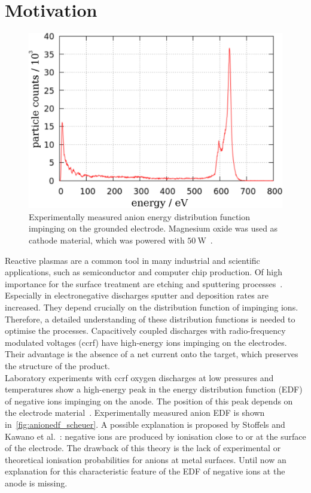 %
	\chapter*{Motivation}
%
        \begin{figure}[!b]
            \centering
            \includegraphics[width=.8\textwidth]{figures/scheuer_anionedf.pdf}
            \caption[Experimentally measured anion EDF at the anode]{%
                Experimentally measured anion energy distribution function impinging %
                on the grounded electrode. Magnesium oxide was used as cathode material, %
                which was powered with $\SI{50}{\watt}$~\cite{Scheuer15}.}
            \label{fig:anionedf_scheuer}
        \end{figure}
%
        Reactive plasmas are a common tool in many industrial and scientific applications, such as semiconductor and computer chip production. Of high importance for the surface treatment are etching and sputtering processes~\cite{Cvelbar05,Zeuner98}. Especially in electronegative discharges sputter and deposition rates are increased. They depend crucially on the distribution function of impinging ions. Therefore, a detailed understanding of these distribution functions is needed to optimise the processes. Capacitively coupled discharges with radio-frequency modulated voltages (ccrf) have high-energy ions impinging on the electrodes. Their advantage is the absence of a net current onto the target, which preserves the structure of the product.\\
        Laboratory experiments with ccrf oxygen discharges at low pressures and temperatures show a high-energy peak in the energy distribution function (EDF) of negative ions impinging on the anode. The position of this peak depends on the electrode material~\cite{Scheuer15}. Experimentally measured anion EDF is shown in~\autoref{fig:anionedf_scheuer}. A possible explanation is proposed by Stoffels and Kawano et al.~\cite{Stoffels01,Kawano83}: negative ions are produced by ionisation close to or at the surface of the electrode. The drawback of this theory is the lack of experimental or theoretical ionisation probabilities for anions at metal surfaces. Until now an explanation for this characteristic feature of the EDF of negative ions at the anode is missing.\\        
